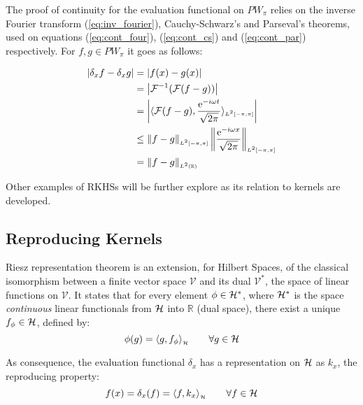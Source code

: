 The proof of continuity for the evaluation functional on $PW_\pi$ relies on the
inverse Fourier transform (\ref{eq:inv_fourier}), Cauchy-Schwarz's and Parseval's
theorems, used on equations (\ref{eq:cont_four}), (\ref{eq:cont_cs}) and
(\ref{eq:cont_par}) respectively.
For $f,g \in PW_\pi$ it goes as follows:

\begin{subequations}
\begin{align}
\left|\delta_x f-\delta_x g\right| &= \left|f(x)-g(x)\right|\\
			  &=\left| \mathcal{F}^{-1}(\mathcal{F}(f-g)) \right|\\
			  &=\left| \langle \mathcal{F}(f-g),\frac{\mathrm{e}^{-i\omega
			  t}}{\sqrt{2\pi}}\rangle_{\scriptscriptstyle L^2[-\pi,\pi]} \right| \label{eq:cont_four}
			  \\
			  &\leq
			  \left\lVert f-g\right\rVert_{\scriptscriptstyle
			  L^2[-\pi,\pi]}\left\lVert\frac{\mathrm{e}^{-i\omega x}}{\sqrt{2\pi}}\right\rVert_{\scriptscriptstyle L^2[-\pi,\pi]} \label{eq:cont_cs} \\
			  &= \left\lVert f-g\right\rVert_{\scriptscriptstyle L^2(\mathbb{R})} \label{eq:cont_par}
\end{align}
\end{subequations}

Other examples of RKHSs will be further explore as its relation to kernels are
developed.

\subsection{Reproducing Kernels}

Riesz representation theorem is an extension, for Hilbert Spaces, of the
classical isomorphism between a finite vector space $\mathcal{V}$ and its dual
$\mathcal{V}^*$, the space of linear functions on $\mathcal{V}$. It states that
for every element $\phi \in \mathcal{H}^*$, where $\mathcal{H}^*$ is the space
\textit{continuous} linear functionals from $\mathcal{H}$ into $\mathbb{R}$ (dual
space), there exist a unique $f_\phi \in \mathcal{H}$, defined by:
\begin{equation*}
\phi(g)= \langle g,f_\phi\rangle_{_{\mathcal{H}}}\qquad \forall g \in \mathcal{H}
\end{equation*}

As consequence, the evaluation functional \(\delta_x\) has a representation on
\(\mathcal{H}\) as \(k_x\), the reproducing property:
\begin{equation*}
f(x) = \delta_x(f) = \langle f,k_x\rangle_{_{\mathcal{H}}}\qquad \forall f \in \mathcal{H}
\end{equation*}


